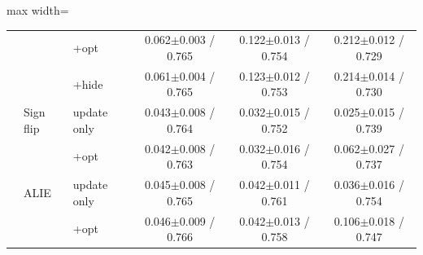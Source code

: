 \begin{table}[tbp]
\begin{adjustbox}{max width=\textwidth}
\begin{tabular}{lllccc}
 &  & +opt & 0.062$\pm$0.003 / 0.765 & 0.122$\pm$0.013 / 0.754 & 0.212$\pm$0.012 / 0.729 \\
 &  & +hide & 0.061$\pm$0.004 / 0.765 & 0.123$\pm$0.012 / 0.753 & 0.214$\pm$0.014 / 0.730 \\
 & Sign flip & update only & 0.043$\pm$0.008 / 0.764 & 0.032$\pm$0.015 / 0.752 & 0.025$\pm$0.015 / 0.739 \\
 &  & +opt & 0.042$\pm$0.008 / 0.763 & 0.032$\pm$0.016 / 0.754 & 0.062$\pm$0.027 / 0.737 \\
 & ALIE & update only & 0.045$\pm$0.008 / 0.765 & 0.042$\pm$0.011 / 0.761 & 0.036$\pm$0.016 / 0.754 \\
 &  & +opt & 0.046$\pm$0.009 / 0.766 & 0.042$\pm$0.013 / 0.758 & 0.106$\pm$0.018 / 0.747 \\
\bottomrule
\end{tabular}
\end{adjustbox}
\end{table}
